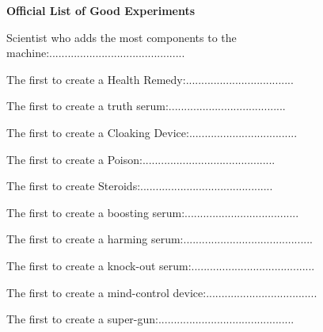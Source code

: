 \documentclass[white]{guildcamp3}
\begin{document}
\name{\wPublishingRace{}} %

\large\textbf{Official List of Good Experiments}  


Scientist who adds the most components to the machine:............................................

The first to create a Health Remedy:...................................

The first to create a truth serum:......................................

The first to create a Cloaking Device:...................................

The first to create a Poison:...........................................

The first to create Steroids:...........................................

The first to create a boosting serum:.....................................

The first to create a harming serum:..........................................

The first to create a knock-out serum:........................................

The first to create a mind-control device:....................................

The first to create a super-gun:............................................



\end{document}
